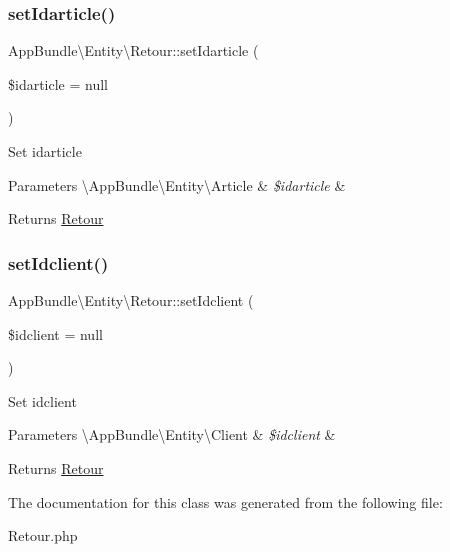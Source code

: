 \subsubsection{\texorpdfstring{set\+Idarticle()}{setIdarticle()}}
{\footnotesize\ttfamily App\+Bundle\textbackslash{}\+Entity\textbackslash{}\+Retour\+::set\+Idarticle (\begin{DoxyParamCaption}\item[{\textbackslash{}\hyperlink{class_app_bundle_1_1_entity_1_1_article}{App\+Bundle\textbackslash{}\+Entity\textbackslash{}\+Article}}]{\$idarticle = {\ttfamily null} }\end{DoxyParamCaption})}

Set idarticle


\begin{DoxyParams}[1]{Parameters}
\textbackslash{}\+App\+Bundle\textbackslash{}\+Entity\textbackslash{}\+Article & {\em \$idarticle} & \\
\hline
\end{DoxyParams}
\begin{DoxyReturn}{Returns}
\hyperlink{class_app_bundle_1_1_entity_1_1_retour}{Retour} 
\end{DoxyReturn}
\mbox{\label{class_app_bundle_1_1_entity_1_1_retour_a7df4640bd39bd942f7cd99a57b77ba8a}} 
\subsubsection{\texorpdfstring{set\+Idclient()}{setIdclient()}}
{\footnotesize\ttfamily App\+Bundle\textbackslash{}\+Entity\textbackslash{}\+Retour\+::set\+Idclient (\begin{DoxyParamCaption}\item[{\textbackslash{}\hyperlink{class_app_bundle_1_1_entity_1_1_client}{App\+Bundle\textbackslash{}\+Entity\textbackslash{}\+Client}}]{\$idclient = {\ttfamily null} }\end{DoxyParamCaption})}

Set idclient


\begin{DoxyParams}[1]{Parameters}
\textbackslash{}\+App\+Bundle\textbackslash{}\+Entity\textbackslash{}\+Client & {\em \$idclient} & \\
\hline
\end{DoxyParams}
\begin{DoxyReturn}{Returns}
\hyperlink{class_app_bundle_1_1_entity_1_1_retour}{Retour} 
\end{DoxyReturn}


The documentation for this class was generated from the following file\+:\begin{DoxyCompactItemize}
\item 
Retour.\+php\end{DoxyCompactItemize}
